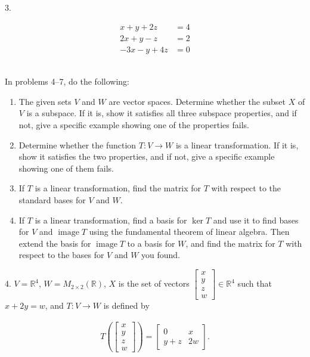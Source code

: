 \documentclass{article}
\begin{document}
3.

\begin{align*}
	x + y + 2z &= 4\\
	2x + y - z &= 2\\
	-3x - y + 4z &= 0
\end{align*}

~\\

In problems 4--7, do the following:

\begin{enumerate}

	\item The given sets $V$ and $W$ are vector spaces. Determine whether the subset $X$ of $V$ is a subspace. If it is, show it satisfies all three subspace properties, and if not, give a specific example showing one of the properties fails.

	\item Determine whether the function $T : V \to W$ is a linear transformation. If it is, show it satisfies the two properties, and if not, give a specific example showing one of them fails.

	\item If $T$ is a linear transformation, find the matrix for $T$ with respect to the standard bases for $V$ and $W$.

	\item If $T$ is a linear transformation, find a basis for $\ker T$ and use it to find bases for $V$ and $\operatorname{image} T$ using the fundamental theorem of linear algebra. Then extend the basis for $\operatorname{image} T$ to a basis for $W$, and find the matrix for $T$ with respect to the bases for $V$ and $W$ you found.

\end{enumerate}

4. $V = \mathbb{R}^4$, $W = M_{2 \times 2}(\mathbb{R})$, $X$ is the set of vectors $\left[\begin{array}{c} x \\ y \\ z \\ w \end{array}\right] \in \mathbb{R}^4$ such that $x + 2y = w$, and $T : V \to W$ is defined by

\begin{align*}
	T\left( \left[\begin{array}{c} x \\ y \\ z \\ w \end{array}\right] \right) = \left[\begin{array}{cc} 0& x \\ y + z& 2w \end{array}\right].
\end{align*}
\end{document}
